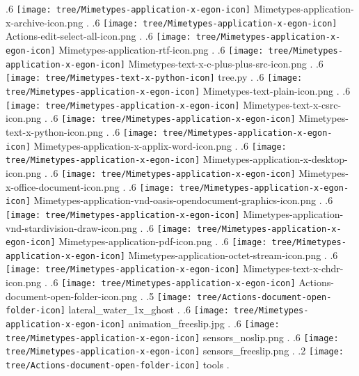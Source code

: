 {.6 { \texttt{[image: tree/Mimetypes-application-x-egon-icon]} Mimetypes-application-x-archive-icon.png }.
.6 { \texttt{[image: tree/Mimetypes-application-x-egon-icon]} Actions-edit-select-all-icon.png }.
.6 { \texttt{[image: tree/Mimetypes-application-x-egon-icon]} Mimetypes-application-rtf-icon.png }.
.6 { \texttt{[image: tree/Mimetypes-application-x-egon-icon]} Mimetypes-text-x-c-plus-plus-src-icon.png }.
.6 { \texttt{[image: tree/Mimetypes-text-x-python-icon]} tree.py }.
.6 { \texttt{[image: tree/Mimetypes-application-x-egon-icon]} Mimetypes-text-plain-icon.png }.
.6 { \texttt{[image: tree/Mimetypes-application-x-egon-icon]} Mimetypes-text-x-csrc-icon.png }.
.6 { \texttt{[image: tree/Mimetypes-application-x-egon-icon]} Mimetypes-text-x-python-icon.png }.
.6 { \texttt{[image: tree/Mimetypes-application-x-egon-icon]} Mimetypes-application-x-applix-word-icon.png }.
.6 { \texttt{[image: tree/Mimetypes-application-x-egon-icon]} Mimetypes-application-x-desktop-icon.png }.
.6 { \texttt{[image: tree/Mimetypes-application-x-egon-icon]} Mimetypes-x-office-document-icon.png }.
.6 { \texttt{[image: tree/Mimetypes-application-x-egon-icon]} Mimetypes-application-vnd-oasis-opendocument-graphics-icon.png }.
.6 { \texttt{[image: tree/Mimetypes-application-x-egon-icon]} Mimetypes-application-vnd-stardivision-draw-icon.png }.
.6 { \texttt{[image: tree/Mimetypes-application-x-egon-icon]} Mimetypes-application-pdf-icon.png }.
.6 { \texttt{[image: tree/Mimetypes-application-x-egon-icon]} Mimetypes-application-octet-stream-icon.png }.
.6 { \texttt{[image: tree/Mimetypes-application-x-egon-icon]} Mimetypes-text-x-chdr-icon.png }.
.6 { \texttt{[image: tree/Mimetypes-application-x-egon-icon]} Actions-document-open-folder-icon.png }.
.5 { \texttt{[image: tree/Actions-document-open-folder-icon]} lateral\_water\_1x\_ghost }.
.6 { \texttt{[image: tree/Mimetypes-application-x-egon-icon]} animation\_freeslip.jpg }.
.6 { \texttt{[image: tree/Mimetypes-application-x-egon-icon]} sensors\_noslip.png }.
.6 { \texttt{[image: tree/Mimetypes-application-x-egon-icon]} sensors\_freeslip.png }.
.2 { \texttt{[image: tree/Actions-document-open-folder-icon]} tools }.
}
